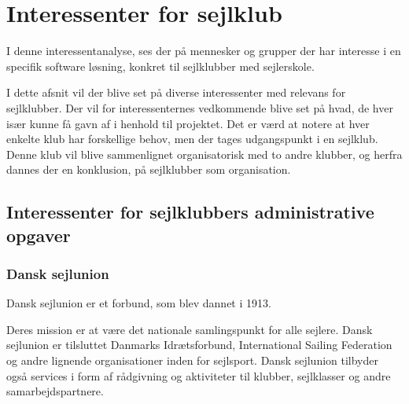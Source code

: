 \chapter{Interessenter for sejlklub}

I denne interessentanalyse, ses der på mennesker og grupper der har interesse i en specifik software løsning, konkret til sejlklubber med sejlerskole.


I dette afsnit vil der blive set på diverse interessenter med relevans for sejlklubber. Der vil for interessenternes
vedkommende blive set på hvad, de hver især kunne få gavn af i henhold til projektet. Det er værd at notere at hver
enkelte klub har forskellige behov, men der tages udgangspunkt i en sejlklub. Denne klub vil blive sammenlignet organisatorisk med to andre klubber, og herfra dannes der en konklusion, på sejlklubber som organisation.

\section{Interessenter for sejlklubbers administrative opgaver}

\subsection{Dansk sejlunion}

Dansk sejlunion er et forbund, som blev dannet i 1913.

Deres mission er at være det nationale samlingspunkt for alle sejlere. Dansk sejlunion er tilsluttet Danmarks
Idrætsforbund, International Sailing Federation og andre lignende organisationer inden for sejlsport. Dansk
sejlunion tilbyder også services i form af rådgivning og aktiviteter til klubber, sejlklasser og andre
samarbejdspartnere.


%


